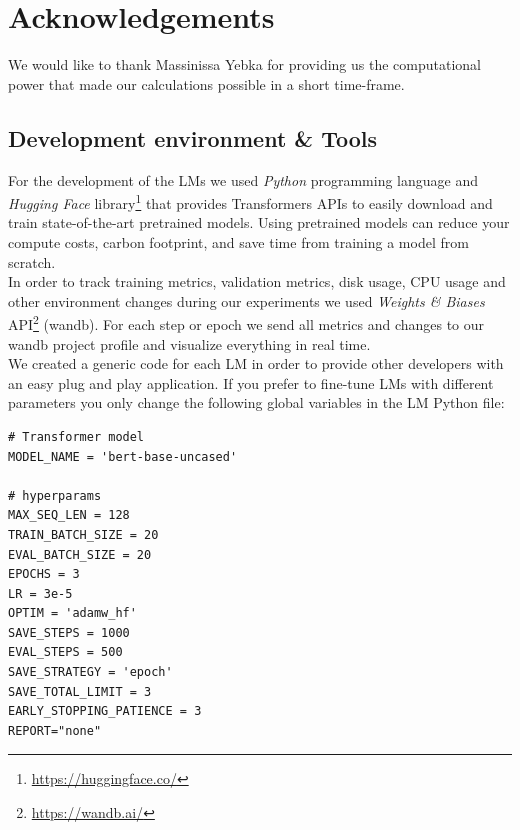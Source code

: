 \documentclass[conference]{IEEEtran}
\begin{document}
\section{Acknowledgements}
We would like to thank Massinissa Yebka for providing us the computational power that made our calculations possible in a short time-frame.






\newpage
\onecolumn
\begin{appendices}

\section{Development environment \& Tools}
For the development of the LMs we used \textit{Python} programming language and \textit{Hugging Face} library\footnote{\url{https://huggingface.co/}} that provides Transformers APIs to easily download and train state-of-the-art pretrained models. Using pretrained models can reduce your compute costs, carbon footprint, and save time from training a model from scratch.\\

In order to track training metrics, validation metrics, disk usage, CPU usage and other environment changes during our experiments we used \textit{Weights \& Biases} API\footnote{\url{https://wandb.ai/}} (wandb). For each step or epoch we send all metrics and changes to our wandb project profile and visualize everything in real time.\\

We created a generic code for each LM in order to provide other developers with an easy plug and play application. If you prefer to fine-tune LMs with different parameters you only change the following global variables in the LM Python file:

\begin{lstlisting}
# Transformer model
MODEL_NAME = 'bert-base-uncased'

# hyperparams
MAX_SEQ_LEN = 128
TRAIN_BATCH_SIZE = 20
EVAL_BATCH_SIZE = 20
EPOCHS = 3
LR = 3e-5
OPTIM = 'adamw_hf'
SAVE_STEPS = 1000
EVAL_STEPS = 500
SAVE_STRATEGY = 'epoch'
SAVE_TOTAL_LIMIT = 3
EARLY_STOPPING_PATIENCE = 3
REPORT="none"
\end{lstlisting}


\end{appendices}
\end{document}
